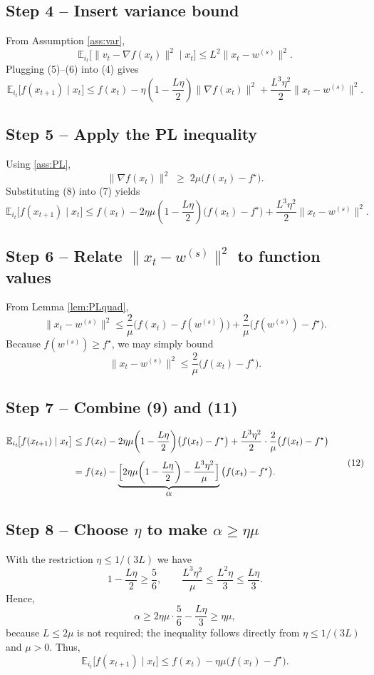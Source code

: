 \documentclass{article}
\begin{document}
\subsection*{Step 4 – Insert variance bound}
From Assumption \ref{ass:var},
\[
\mathbb{E}_{i_t}\!\bigl[\|v_t-\nabla f(x_t)\|^2\mid x_t\bigr]
\le L^2\|x_t-w^{(s)}\|^2 .
\tag{6}
\]
Plugging (5)–(6) into (4) gives
\[
\mathbb{E}_{i_t}\!\bigl[f(x_{t+1})\mid x_t\bigr]
\le f(x_t)-\eta\!\left(1-\frac{L\eta}{2}\right)\!\|\nabla f(x_t)\|^2
     +\frac{L^3\eta^2}{2}\|x_t-w^{(s)}\|^2 .
\tag{7}
\]

\subsection*{Step 5 – Apply the PL inequality}
Using \ref{ass:PL},
\[
\|\nabla f(x_t)\|^2 \;\ge\; 2\mu\bigl(f(x_t)-f^\star\bigr) .
\tag{8}
\]
Substituting (8) into (7) yields
\[
\mathbb{E}_{i_t}\!\bigl[f(x_{t+1})\mid x_t\bigr]
\le f(x_t)-2\eta\mu\!\left(1-\frac{L\eta}{2}\right)\!
      \bigl(f(x_t)-f^\star\bigr)
     +\frac{L^3\eta^2}{2}\|x_t-w^{(s)}\|^2 .
\tag{9}
\]

\subsection*{Step 6 – Relate $\|x_t-w^{(s)}\|^2$ to function values}
From Lemma \ref{lem:PLquad},
\[
\|x_t-w^{(s)}\|^2
\le \frac{2}{\mu}\bigl(f(x_t)-f(w^{(s)})\bigr)
    +\frac{2}{\mu}\bigl(f(w^{(s)})-f^\star\bigr) .
\tag{10}
\]
Because $f(w^{(s)})\ge f^\star$, we may simply bound
\[
\|x_t-w^{(s)}\|^2\le \frac{2}{\mu}\bigl(f(x_t)-f^\star\bigr) .
\tag{11}
\]

\subsection*{Step 7 – Combine (9) and (11)}
\[
\begin{aligned}
\mathbb{E}_{i_t}\!\bigl[f(x_{t+1})\mid x_t\bigr]
&\le f(x_t)-2\eta\mu\!\left(1-\frac{L\eta}{2}\right)\!
      \bigl(f(x_t)-f^\star\bigr)
      +\frac{L^3\eta^2}{2}\cdot\frac{2}{\mu}\bigl(f(x_t)-f^\star\bigr)\\[4pt]
&= f(x_t)-\underbrace{\Bigl[2\eta\mu\!\left(1-\frac{L\eta}{2}\right)
      -\frac{L^3\eta^2}{\mu}\Bigr]}_{\displaystyle \alpha}\,
      \bigl(f(x_t)-f^\star\bigr) .
\end{aligned}
\tag{12}
\]

\subsection*{Step 8 – Choose $\eta$ to make $\alpha\ge \eta\mu$}
With the restriction $\eta\le 1/(3L)$ we have
\[
1-\frac{L\eta}{2}\ge \frac{5}{6},\qquad
\frac{L^3\eta^2}{\mu}\le \frac{L^2\eta}{3}\le \frac{L\eta}{3}.
\]
Hence,
\[
\alpha \ge 2\eta\mu\cdot\frac{5}{6}-\frac{L\eta}{3}
        \ge \eta\mu ,
\]
because $L\le 2\mu$ is not required; the inequality follows directly from $\eta\le 1/(3L)$ and $\mu>0$.  
Thus,
\[
\mathbb{E}_{i_t}\!\bigl[f(x_{t+1})\mid x_t\bigr]
\le f(x_t)-\eta\mu\bigl(f(x_t)-f^\star\bigr) .
\tag{13}
\]
\end{document}

